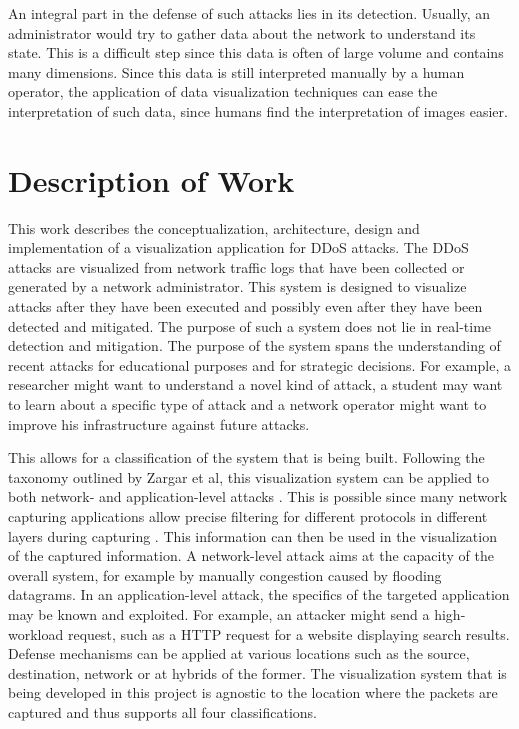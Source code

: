 An integral part in the defense of such attacks lies in its detection. Usually, an administrator would try to gather data about the network to understand its state. This is a difficult step since this data is often of large volume and contains many dimensions.
Since this data is still interpreted manually by a human operator, the application of data visualization techniques can ease the interpretation of such data, since humans find the interpretation of images easier\cite{wu}.

\section{Description of Work}
This work describes the conceptualization, architecture, design and implementation of a visualization application for DDoS attacks.
The DDoS attacks are visualized from network traffic logs that have been collected or generated by a network administrator. This system is designed to visualize attacks after they have been executed and possibly even after they have been detected and mitigated. The purpose of such a system does not lie in real-time detection and mitigation. The purpose of the system spans the understanding of recent attacks for educational purposes and for strategic decisions. For example, a researcher might want to understand a novel kind of attack, a student may want to learn about a specific type of attack and a network operator might want to improve his infrastructure against future attacks.

This allows for a classification of the system that is being built. Following the taxonomy outlined by Zargar et al, this visualization system can be applied to both network- and application-level attacks \cite{zargar}. This is possible since many network capturing applications allow precise filtering for different protocols in different layers during capturing \cite{tcpdump}. This information can then be used in the visualization of the captured information.
A network-level attack aims at the capacity of the overall system, for example by manually congestion caused by flooding datagrams. In an application-level attack, the specifics of the targeted application may be known and exploited. For example, an attacker might send a high-workload request, such as a HTTP request for a website displaying search results.
Defense mechanisms can be applied at various locations such as the source, destination, network or at hybrids of the former.
The visualization system that is being developed in this project is agnostic to the location where the packets are captured and thus supports all four classifications.


